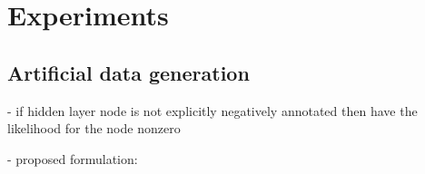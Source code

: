 \section{Experiments}
\label{sec:exp}

\subsection*{Artificial data generation}

- if hidden layer node is not explicitly negatively annotated 
then have the likelihood for the node nonzero

- proposed formulation: 
